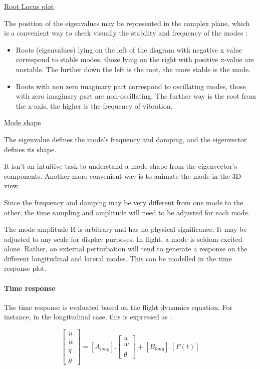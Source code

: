 \documentclass[a4paper,twoside,12pt,dvips]{article}
\begin{document}
\underline{Root Locus plot}

The position of the eigenvalues may be represented in the complex
plane, which is a convenient way to check visually the stability and
frequency of the modes :

\begin{itemize}
\item Roots (eigenvalues) lying on the left of the diagram with
negative x value correspond to stable modes, those lying on the right
with positive x-value are unstable.\newline
The further down the left is the root, the more stable is the mode.
\item Roots with non zero imaginary part correspond to oscillating
modes, those with zero imaginary part are non-oscillating.\newline
The further way is the root from the x-axis, the higher is the
frequency of vibration.
\end{itemize}

\underline{Mode shape}

The eigenvalue defines the mode's frequency and damping, and the
eigenvector defines its shape.

It isn't an intuitive task to understand a mode shape from the
eigenvector's components. Another more convenient way is to animate
the mode in the 3D view.

Since the frequency and damping may be very different from one mode to
the other, the time sampling and amplitude will need to be adjusted
for each mode.

The mode amplitude R is arbitrary and has no physical significance. It
may be adjusted to any scale for display purposes. In flight, a mode
is seldom excited alone. Rather, an external perturbation will tend to
generate a response on the different longitudinal and lateral modes.
This can be modelled in the time response plot.

\paragraph{Time response}

The time response is evaluated based on the flight dynamics equation.
For instance, in the longitudinal case, this is expressed as :

$$\left[\begin{matrix} \dot{u} \\ \dot{w} \\ \dot{q} \\ \dot{\theta} \end{matrix}\right] = \left[A_{long}\right] . \left[\begin{matrix} u \\ w \\  \\ \theta \end{matrix}\right] + \left[B_{long}\right] . \left[F(t)\right]$$
\end{document}
